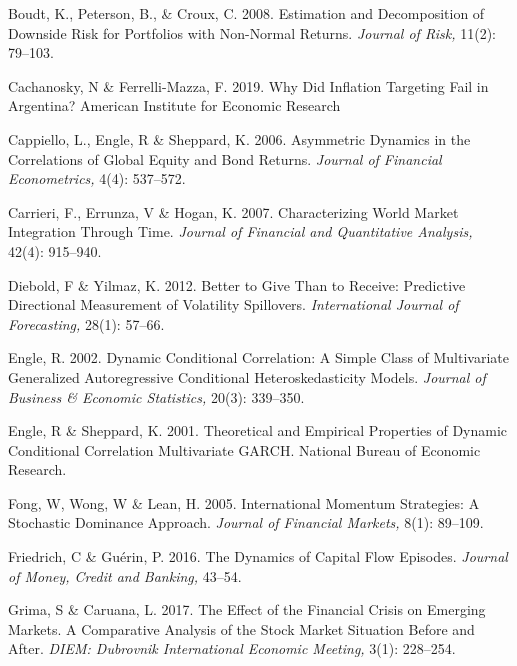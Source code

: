 \documentclass[11pt,preprint, authoryear]{elsarticle}
\numberwithin{equation}{section}
\numberwithin{figure}{section}
\numberwithin{table}{section}
\begin{document}
\leavevmode\hypertarget{ref-boudt2008estimation}{}%
Boudt, K., Peterson, B., \& Croux, C. 2008. Estimation
and Decomposition of Downside Risk for Portfolios with Non-Normal
Returns. \emph{Journal of Risk,} 11(2): 79--103.

\leavevmode\hypertarget{ref-cachanosky2019did}{}%
Cachanosky, N \& Ferrelli-Mazza, F. 2019. Why Did
Inflation Targeting Fail in Argentina? American Institute for Economic Research

\leavevmode\hypertarget{ref-cappiello2006asymmetric}{}%
Cappiello, L., Engle, R \& Sheppard, K. 2006.
Asymmetric Dynamics in the Correlations of Global Equity and Bond
Returns. \emph{Journal of Financial Econometrics,} 4(4): 537--572.

\leavevmode\hypertarget{ref-carrieri2007characterizing}{}%
Carrieri, F., Errunza, V \& Hogan, K. 2007.
Characterizing World Market Integration Through Time. \emph{Journal
of Financial and Quantitative Analysis,} 42(4): 915--940.

\leavevmode\hypertarget{ref-diebold2012better}{}%
Diebold, F \& Yilmaz, K. 2012. Better to Give Than to
Receive: Predictive Directional Measurement of Volatility Spillovers.
\emph{International Journal of Forecasting,} 28(1): 57--66.

\leavevmode\hypertarget{ref-engle2002dynamic}{}%
Engle, R. 2002. Dynamic Conditional Correlation: A Simple Class
of Multivariate Generalized Autoregressive Conditional
Heteroskedasticity Models. \emph{Journal of Business \& Economic
Statistics,} 20(3): 339--350.

\leavevmode\hypertarget{ref-engle2001theoretical}{}%
Engle, R \& Sheppard, K. 2001. Theoretical and Empirical
Properties of Dynamic Conditional Correlation Multivariate GARCH.
National Bureau of Economic Research.

\leavevmode\hypertarget{ref-fong2005international}{}%
Fong, W, Wong, W \& Lean, H. 2005.
International Momentum Strategies: A Stochastic Dominance Approach.
\emph{Journal of Financial Markets,} 8(1): 89--109.

\leavevmode\hypertarget{ref-friedrich2016dynamics}{}%
Friedrich, C \& Guérin, P. 2016. The Dynamics of Capital
Flow Episodes. \emph{Journal of Money, Credit and Banking,} 43--54.

\leavevmode\hypertarget{ref-grima2017effect}{}%
Grima, S \& Caruana, L. 2017. The Effect of the Financial
Crisis on Emerging Markets. A Comparative Analysis of the Stock Market
Situation Before and After. \emph{DIEM: Dubrovnik International
Economic Meeting,} 3(1): 228--254.
\end{document}
